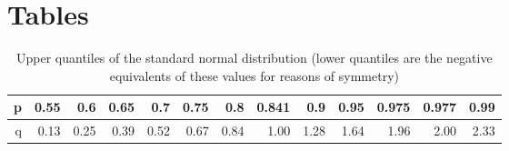 \chapter{Tables}
\label{ch:tables}

\begin{table}[ht]
\centering
\begin{tabular}{rrrrrrrrrrrrr}
  \hline
 p & 0.55 & 0.6 & 0.65 & 0.7 & 0.75 & 0.8 & 0.841 & 0.9 & 0.95 & 0.975 & 0.977 & 0.99 \\ 
  \hline
 q & 0.13 & 0.25 & 0.39 & 0.52 & 0.67 & 0.84 & 1.00 & 1.28 & 1.64 & 1.96 & 2.00 & 2.33 \\ 
   \hline
\end{tabular}
\caption{Upper quantiles of the standard normal distribution (lower quantiles are the negative equivalents of these values for reasons of symmetry)} 
\end{table}



